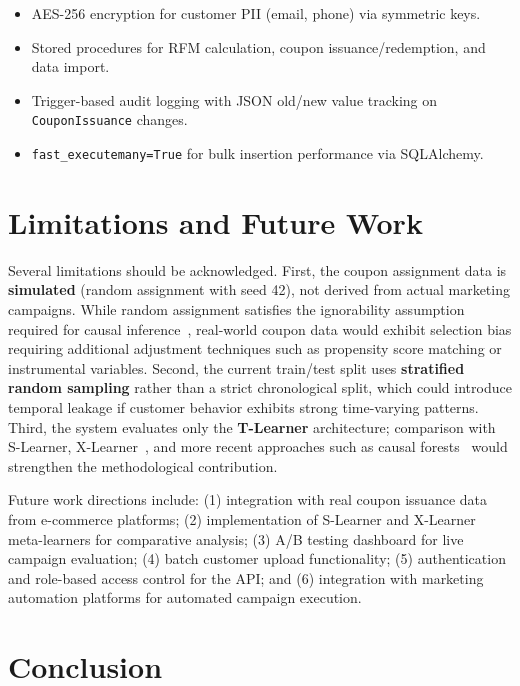 \documentclass[11pt,a4paper,twoside]{article}
\begin{document}
\begin{itemize}
    \item AES-256 encryption for customer PII (email, phone) via symmetric keys.
    \item Stored procedures for RFM calculation, coupon issuance/redemption, and data import.
    \item Trigger-based audit logging with JSON old/new value tracking on \texttt{CouponIssuance} changes.
    \item \texttt{fast\_executemany=True} for bulk insertion performance via SQLAlchemy.
\end{itemize}

\section{Limitations and Future Work}

Several limitations should be acknowledged. First, the coupon assignment data is \textbf{simulated} (random assignment with seed 42), not derived from actual marketing campaigns. While random assignment satisfies the ignorability assumption required for causal inference~\cite{rubin1974}, real-world coupon data would exhibit selection bias requiring additional adjustment techniques such as propensity score matching or instrumental variables. Second, the current train/test split uses \textbf{stratified random sampling} rather than a strict chronological split, which could introduce temporal leakage if customer behavior exhibits strong time-varying patterns. Third, the system evaluates only the \textbf{T-Learner} architecture; comparison with S-Learner, X-Learner~\cite{kunzel2019}, and more recent approaches such as causal forests~\cite{athey2019} would strengthen the methodological contribution.

Future work directions include: (1) integration with real coupon issuance data from e-commerce platforms; (2) implementation of S-Learner and X-Learner meta-learners for comparative analysis; (3) A/B testing dashboard for live campaign evaluation; (4) batch customer upload functionality; (5) authentication and role-based access control for the API; and (6) integration with marketing automation platforms for automated campaign execution.

\section{Conclusion}
\end{document}
